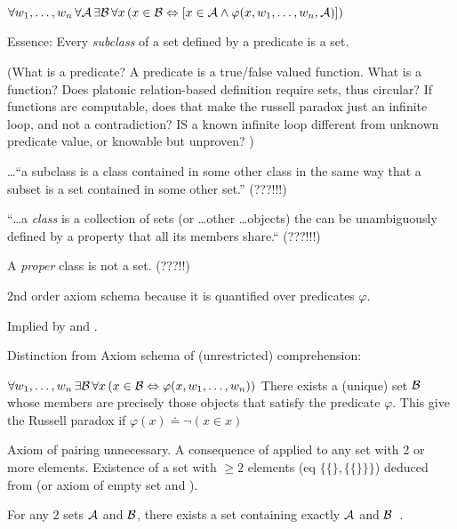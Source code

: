 ${\displaystyle 
\forall w_{1},\ldots ,w_{n}\,
\forall \mathcal{A}\,\exists \mathcal{B}\,
\forall x\,
(x\in \mathcal{B}
\Leftrightarrow
[x\in \mathcal{A}\land \varphi (x,w_{1},\ldots ,w_{n},\mathcal{A})])}$

Essence:
Every \textsl{subclass}
of a set defined by a predicate is a set.

(What is a predicate?
A predicate is a true/false valued function.
What is a function? 
Does platonic relation-based definition require sets,
thus circular?
If functions are computable, does that make the
russell paradox just an infinite loop,
and not a contradiction?
IS a known infinite loop different from 
unknown predicate value, or knowable but unproven?
)

\ldots``a subclass is a class contained in some other class in 
the same way that a subset is a set contained in some other set.''
\cite{wiki:Subclass_set_theory}
(???!!!)

``\dots a \textsl{class} is a collection of sets 
(or \ldots other \ldots objects)
the can be unambiguously defined by a property 
that all its members share.``\cite{wiki:Class_set_theory}
(???!!!)

A \textsl{proper} class is not a set. (???!!)

2nd order axiom schema because it is quantified over predicates
 $\varphi$.

Implied by 
and \cite{wiki:Axiom_of_empty_set}.

Distinction from Axiom schema of (unrestricted) comprehension:

$\forall w_1,\ldots,w_n \, \exists \mathcal{B} \, 
\forall x \, ( x \in \mathcal{B} 
\Leftrightarrow \varphi(x, w_1, \ldots, w_n) )$
There exists a (unique) set $\mathcal{B}$ 
whose members are precisely those objects 
that satisfy the predicate $\varphi$.
This give the Russell paradox if 
$\varphi(x) \doteq \neg(x \in x)$

\label{sec:Axiom-of-pairing}

Axiom of pairing unnecessary.
A consequence of 
applied to any set with $2$ or more elements.
Existence of a set with $\geq 2$ elements
(eq $\{ \{\}, \{ \{\} \} \}$)
deduced from 
(or axiom of empty set\cite{wiki:Axiom_of_empty_set}
and ).

For any $2$ sets $\mathcal{A}$ and $\mathcal{B}$,
there exists a set containing exactly $\mathcal{A}$ and 
$\mathcal{B}$~\cite{wiki:Axiom_of_pairing}.

